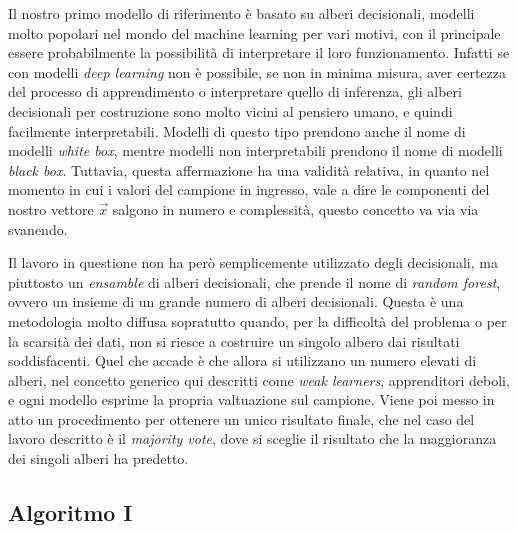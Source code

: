 Il nostro primo modello di riferimento\cite{Toma2022} è basato su
alberi decisionali, modelli molto popolari nel mondo del machine learning
per vari motivi, con il principale essere probabilmente la possibilità
di interpretare il loro funzionamento.
Infatti se con modelli {\it deep learning} non è possibile, se non in
minima misura, aver certezza del processo di apprendimento o interpretare
quello di inferenza, gli alberi decisionali per costruzione sono molto
vicini al pensiero umano, e quindi facilmente interpretabili.
Modelli di questo tipo prendono anche il nome di modelli {\it white box},
mentre modelli non interpretabili prendono il nome di modelli {\it black box}.
Tuttavia, questa affermazione ha una validità relativa, in quanto
nel momento in cui i valori del campione in ingresso, vale a dire le
componenti del nostro vettore $\vec{x}$ salgono in numero e complessità,
questo concetto va via via svanendo.

Il lavoro in questione non ha però semplicemente utilizzato degli decisionali,
ma piuttosto un {\it ensamble} di alberi decisionali, che prende il nome
di {\it random forest}, ovvero un insieme di un grande numero di alberi decisionali.
Questa è una metodologia molto diffusa sopratutto quando, per la difficoltà del
problema o per la scarsità dei dati, non si riesce a costruire un singolo
albero dai risultati soddisfacenti.
Quel che accade è che allora si utilizzano un numero elevati di alberi,
nel concetto generico qui descritti come {\it weak learners}, apprenditori
deboli, e ogni modello esprime la propria valtuazione sul campione.
Viene poi messo in atto un procedimento per ottenere un unico risultato finale,
che nel caso del lavoro descritto è il {\it majority vote}, dove si sceglie
il risultato che la maggioranza dei singoli alberi ha predetto.

\subsection{Algoritmo I}

